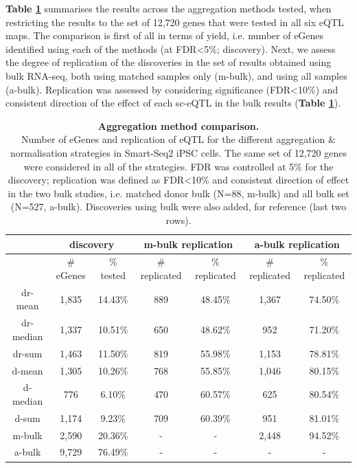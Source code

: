 \textbf{Table \ref{tab:egenes}} summarises the results across the aggregation methods tested, when restricting the results to the set of 12,720 genes that were tested in all six eQTL maps.
The comparison is first of all in terms of yield, i.e. number of eGenes identified using each of the methods (at FDR<5\%; discovery).
Next, we assess the degree of replication of the discoveries in the set of results obtained using bulk RNA-seq, both using matched samples only (m-bulk), and using all samples (a-bulk).
Replication was assessed by considering significance (FDR<10\%) and consistent direction of the effect of each sc-eQTL in the bulk results (\textbf{Table \ref{tab:egenes}}).\\

\begin{table}[h]
    \centering
    \begin{tabular}{c|c c|c c|c c}
    & \multicolumn{2}{c}{discovery}&\multicolumn{2}{c}{m-bulk replication} &\multicolumn{2}{c}{a-bulk replication}\\
    \hline
    & \# eGenes & \% tested & \# replicated & \% replicated & \# replicated & \% replicated \\
    \hline
    dr-mean   &  1,835 & 14.43\% & 889 & 48.45\% & 1,367 & 74.50\% \\
    dr-median &  1,337 & 10.51\% & 650 & 48.62\% &   952 & 71.20\% \\
    dr-sum    &  1,463 & 11.50\% & 819 & 55.98\% & 1,153 & 78.81\% \\
    d-mean    &  1,305 & 10.26\% & 768 & 55.85\% & 1,046 & 80.15\% \\
    d-median  &    776 &  6.10\% & 470 & 60.57\% &   625 & 80.54\% \\
    d-sum     &  1,174 &  9.23\% & 709 & 60.39\% &   951 & 81.01\% \\
    \hline
    m-bulk    &  2,590 & 20.36\% & - & - & 2,448 & 94.52\% \\
    a-bulk    &  9,729 & 76.49\% & - & - & - & - \\
    \end{tabular}
    \caption[Aggregation method comparison]{\textbf{Aggregation method comparison.}\\
    Number of eGenes and replication of eQTL for the different aggregation \& normalisation strategies in Smart-Seq2 iPSC cells. 
    The same set of 12,720 genes were considered in all of the strategies.
    FDR was controlled at 5\% for the discovery; replication was defined as FDR<10\% and consistent direction of effect in the two bulk studies, i.e. matched donor bulk (N=88, m-bulk) and all bulk set (N=527, a-bulk).
    Discoveries using bulk were also added, for reference (last two rows).}
    \label{tab:egenes}
\end{table}


